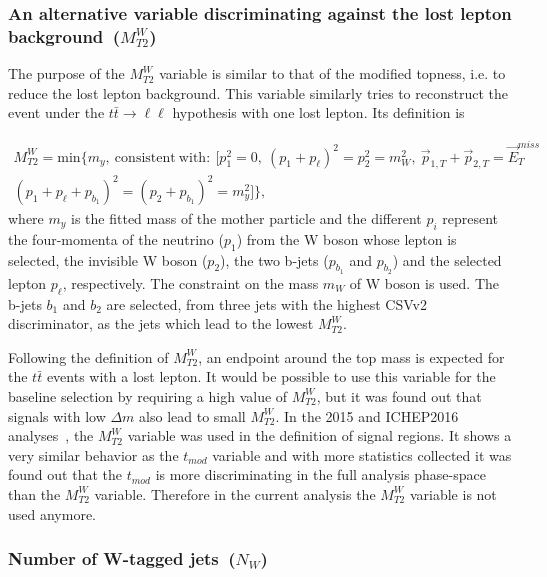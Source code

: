 \subsubsection{An alternative variable discriminating against the lost lepton background~($M_{T2}^{W}$)~\label{sec:mt2w}}

The purpose of the $M_{T2}^{W}$ variable is similar to that of the modified topness, i.e. to reduce the lost lepton background. This variable similarly tries to reconstruct the event under the $t \bar{t} \to \ell \ell$ hypothesis with one lost lepton. Its definition is

\begin{equation}
\begin{split}
M_{T2}^{W} = \mathrm{min}\{m_{y},~\mathrm{consistent~with:}~[p_{1}^{2}=0,~(p_{1}+p_{\ell})^{2} = p_{2}^{2} =m_{W}^{2},~ \vec{p}_{1,T}+\vec{p}_{2,T}= \vec{E}_{T}^{miss} \\
(p_{1} + p_{\ell} + p_{b_{1}})^{2} =  (p_{2} + p_{b_{1}})^{2} = m_{y}^{2}]\},
\end{split}
\end{equation}
where $m_{y}$ is the fitted mass of the mother particle and the different $p_{i}$ represent the four-momenta of the neutrino ($p_{1}$) from the W boson whose lepton is selected, the invisible W boson ($p_{2}$), the two b-jets ($p_{b_{1}}$ and $p_{b_{2}}$) and the selected lepton $p_{\ell}$, respectively. The constraint on the mass $m_{W}$ of W boson is used. The b-jets $b_{1}$ and $b_{2}$ are selected, from three jets with the highest CSVv2 discriminator, as the jets which lead to the lowest $M_{T2}^{W}$.

Following the definition of $M_{T2}^{W}$,  an endpoint around the top mass is expected for the $t\bar{t}$ events with a lost lepton. It would be possible to use this variable for the baseline selection by requiring a high value of $M_{T2}^{W}$, but it was found out that signals with low $\Delta m$ also lead to small $M_{T2}^{W}$. In the 2015 and ICHEP2016 analyses~\cite{Sirunyan:2016jpr, CMS:2016vew}, the $M_{T2}^{W}$ variable was used in the definition of signal regions. It shows a  very similar behavior as the $t_{mod}$ variable and with more statistics collected it was found out that the $t_{mod}$ is more discriminating in the full analysis phase-space than the $M_{T2}^{W}$ variable. Therefore in the current analysis the $M_{T2}^{W}$ variable is not used anymore.


\subsubsection{Number of W-tagged jets~($N_{W}$)}


